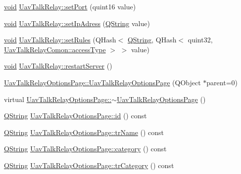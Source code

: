 \begin{DoxyCompactItemize}
\item 
\hyperlink{group___u_a_v_objects_plugin_ga444cf2ff3f0ecbe028adce838d373f5c}{void} \hyperlink{group___u_a_v_talk_ga5ef623c050c9d1a65536f7de2eeda738}{\-Uav\-Talk\-Relay\-::set\-Port} (quint16 value)
\item 
\hyperlink{group___u_a_v_objects_plugin_ga444cf2ff3f0ecbe028adce838d373f5c}{void} \hyperlink{group___u_a_v_talk_gaae8733ac23163492f5ea685cc69950ca}{\-Uav\-Talk\-Relay\-::set\-Ip\-Adress} (\hyperlink{group___u_a_v_objects_plugin_gab9d252f49c333c94a72f97ce3105a32d}{\-Q\-String} value)
\item 
\hyperlink{group___u_a_v_objects_plugin_ga444cf2ff3f0ecbe028adce838d373f5c}{void} \hyperlink{group___u_a_v_talk_ga61c935860a7d4f77e40c58c10557eed4}{\-Uav\-Talk\-Relay\-::set\-Rules} (\-Q\-Hash$<$ \hyperlink{group___u_a_v_objects_plugin_gab9d252f49c333c94a72f97ce3105a32d}{\-Q\-String}, \-Q\-Hash$<$ quint32, \hyperlink{group___u_a_v_talk_plugin_gae73e1677650d617d825cf2224fa0626a}{\-Uav\-Talk\-Relay\-Comon\-::access\-Type} $>$ $>$ value)
\item 
\hyperlink{group___u_a_v_objects_plugin_ga444cf2ff3f0ecbe028adce838d373f5c}{void} \hyperlink{group___u_a_v_talk_gac7de28de1557a197ee88c192917bca40}{\-Uav\-Talk\-Relay\-::restart\-Server} ()
\item 
\hyperlink{group___u_a_v_talk_gac97773c8e2650a9c89d3b44262b3c9a5}{\-Uav\-Talk\-Relay\-Options\-Page\-::\-Uav\-Talk\-Relay\-Options\-Page} (\-Q\-Object $\ast$parent=0)
\item 
virtual \hyperlink{group___u_a_v_talk_gab4a5b0b63eba0e6df8f5d81ab10f5fff}{\-Uav\-Talk\-Relay\-Options\-Page\-::$\sim$\-Uav\-Talk\-Relay\-Options\-Page} ()
\item 
\hyperlink{group___u_a_v_objects_plugin_gab9d252f49c333c94a72f97ce3105a32d}{\-Q\-String} \hyperlink{group___u_a_v_talk_ga1a7f2a6d7fe0eab1466ad5fef1d77448}{\-Uav\-Talk\-Relay\-Options\-Page\-::id} () const 
\item 
\hyperlink{group___u_a_v_objects_plugin_gab9d252f49c333c94a72f97ce3105a32d}{\-Q\-String} \hyperlink{group___u_a_v_talk_gaa9de5e7b246a6ed8f405cd79586bcbab}{\-Uav\-Talk\-Relay\-Options\-Page\-::tr\-Name} () const 
\item 
\hyperlink{group___u_a_v_objects_plugin_gab9d252f49c333c94a72f97ce3105a32d}{\-Q\-String} \hyperlink{group___u_a_v_talk_ga096c5d44abc589317aae875f985190ed}{\-Uav\-Talk\-Relay\-Options\-Page\-::category} () const 
\item 
\hyperlink{group___u_a_v_objects_plugin_gab9d252f49c333c94a72f97ce3105a32d}{\-Q\-String} \hyperlink{group___u_a_v_talk_ga06b96ea896336a6b5cbf6431a19b60f7}{\-Uav\-Talk\-Relay\-Options\-Page\-::tr\-Category} () const 

\end{DoxyCompactItemize}
